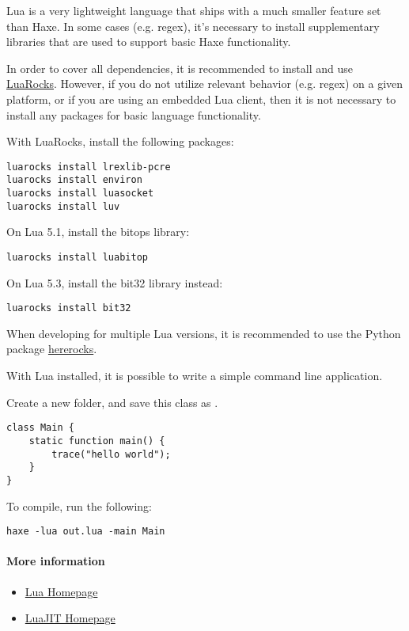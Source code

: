 Lua is a very lightweight language that ships with a much smaller  feature set
than Haxe.  In some cases (e.g. regex), it's necessary to install supplementary
libraries that are used to support basic Haxe functionality.

In order to cover all dependencies, it is recommended to install and use
\href{https://github.com/luarocks/luarocks/wiki/Download}{LuaRocks}.  However,
if you do not utilize relevant behavior (e.g. regex) on a given platform,
or if you are using an embedded Lua client, then it is not necessary to
install any packages for basic language functionality.

With LuaRocks, install the following packages:

\begin{lstlisting}
luarocks install lrexlib-pcre
luarocks install environ
luarocks install luasocket
luarocks install luv
\end{lstlisting}

On Lua 5.1, install the bitops library:
\begin{lstlisting}
luarocks install luabitop
\end{lstlisting}

On Lua 5.3, install the bit32 library instead:
\begin{lstlisting}
luarocks install bit32
\end{lstlisting}

When developing for multiple Lua versions, it is recommended to use
the Python package \href{https://github.com/mpeterv/hererocks}{hererocks}.

With Lua installed, it is possible to write a simple command line application.

Create a new folder, and save this class as .

\begin{lstlisting}
class Main {
    static function main() {
        trace("hello world");
    }
}
\end{lstlisting}

To compile, run the following:
\begin{lstlisting}
haxe -lua out.lua -main Main
\end{lstlisting}

\paragraph{More information}
\begin{itemize}
	\item \href{https://www.lua.org/}{Lua Homepage}
	\item \href{http://luajit.org/}{LuaJIT Homepage}
\end{itemize}

